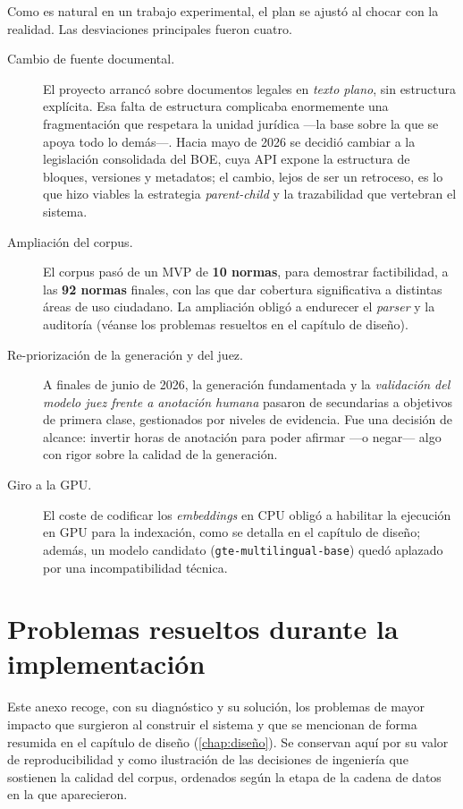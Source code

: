 Como es natural en un trabajo experimental, el plan se ajustó al chocar con la realidad. Las desviaciones principales fueron cuatro.

\begin{description}
  \item[Cambio de fuente documental.] El proyecto arrancó sobre documentos legales en \emph{texto plano}, sin estructura explícita. Esa falta de estructura complicaba enormemente una fragmentación que respetara la unidad jurídica —la base sobre la que se apoya todo lo demás—. Hacia mayo de 2026 se decidió cambiar a la legislación consolidada del BOE, cuya API expone la estructura de bloques, versiones y metadatos; el cambio, lejos de ser un retroceso, es lo que hizo viables la estrategia \emph{parent-child} y la trazabilidad que vertebran el sistema.
  \item[Ampliación del corpus.] El corpus pasó de un MVP de \textbf{10 normas}, para demostrar factibilidad, a las \textbf{92 normas} finales, con las que dar cobertura significativa a distintas áreas de uso ciudadano. La ampliación obligó a endurecer el \emph{parser} y la auditoría (véanse los problemas resueltos en el capítulo de diseño).
  \item[Re-priorización de la generación y del juez.] A finales de junio de 2026, la generación fundamentada y la \emph{validación del modelo juez frente a anotación humana} pasaron de secundarias a objetivos de primera clase, gestionados por niveles de evidencia. Fue una decisión de alcance: invertir horas de anotación para poder afirmar —o negar— algo con rigor sobre la calidad de la generación.
  \item[Giro a la GPU.] El coste de codificar los \emph{embeddings} en CPU obligó a habilitar la ejecución en GPU para la indexación, como se detalla en el capítulo de diseño; además, un modelo candidato (\texttt{gte-multilingual-base}) quedó aplazado por una incompatibilidad técnica.
\end{description}

\chapter{Problemas resueltos durante la implementación}
\label{app:problemas}

Este anexo recoge, con su diagnóstico y su solución, los problemas de mayor impacto que surgieron al construir el sistema y que se mencionan de forma resumida en el capítulo de diseño (\ref{chap:diseño}). Se conservan aquí por su valor de reproducibilidad y como ilustración de las decisiones de ingeniería que sostienen la calidad del corpus, ordenados según la etapa de la cadena de datos en la que aparecieron.

